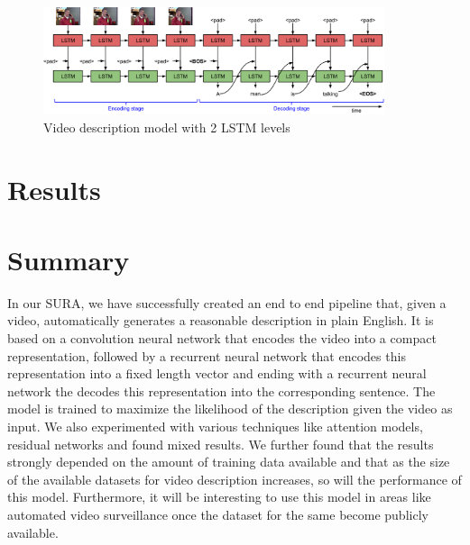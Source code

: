 \documentclass[12pt]{article}
\begin{document}
				\begin{figure}[ht!]
				\centering
					\includegraphics[width=10cm]{s2vt.png}
					\caption{Video description model with 2 LSTM levels\label{fig1}}
				\end{figure}

\section{Results}

\section{Summary}
	In our SURA, we have successfully created an end to end pipeline that, given a video, automatically
	generates a reasonable description in plain English. It is based on a convolution neural network that
	encodes the video into a compact representation, followed by a recurrent neural network that encodes
	this representation into a fixed length vector and ending with a recurrent neural network the decodes this
	representation into the corresponding sentence. The model is trained to maximize the likelihood of the description
	given the video as input. We also experimented with various techniques like attention models, residual networks and 
	found mixed results. We further found that the results strongly depended on the amount of training data available and
	that as the size of the available datasets for video description increases, so will the performance of this model.
	Furthermore, it will be interesting to use this model in areas like automated video surveillance once the dataset
	for the same become publicly available.
\end{document}
